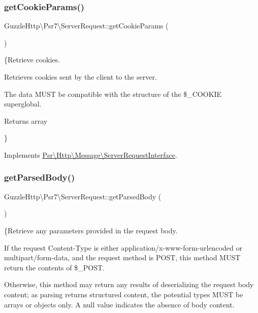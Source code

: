 \subsubsection{\texorpdfstring{get\+Cookie\+Params()}{getCookieParams()}}
{\footnotesize\ttfamily Guzzle\+Http\textbackslash{}\+Psr7\textbackslash{}\+Server\+Request\+::get\+Cookie\+Params (\begin{DoxyParamCaption}{ }\end{DoxyParamCaption})}

\{Retrieve cookies.

Retrieves cookies sent by the client to the server.

The data M\+U\+ST be compatible with the structure of the \$\+\_\+\+C\+O\+O\+K\+IE superglobal.

\begin{DoxyReturn}{Returns}
array
\end{DoxyReturn}
\} 

Implements \hyperlink{interfacePsr_1_1Http_1_1Message_1_1ServerRequestInterface_ab9ba930a8a2d62d54213dc07334fc379}{Psr\textbackslash{}\+Http\textbackslash{}\+Message\textbackslash{}\+Server\+Request\+Interface}.

\mbox{\label{classGuzzleHttp_1_1Psr7_1_1ServerRequest_a1ba7206b9235bef8c1c615bcb6528aa6}} 
\subsubsection{\texorpdfstring{get\+Parsed\+Body()}{getParsedBody()}}
{\footnotesize\ttfamily Guzzle\+Http\textbackslash{}\+Psr7\textbackslash{}\+Server\+Request\+::get\+Parsed\+Body (\begin{DoxyParamCaption}{ }\end{DoxyParamCaption})}

\{Retrieve any parameters provided in the request body.

If the request Content-\/\+Type is either application/x-\/www-\/form-\/urlencoded or multipart/form-\/data, and the request method is P\+O\+ST, this method M\+U\+ST return the contents of \$\+\_\+\+P\+O\+ST.

Otherwise, this method may return any results of deserializing the request body content; as parsing returns structured content, the potential types M\+U\+ST be arrays or objects only. A null value indicates the absence of body content.

